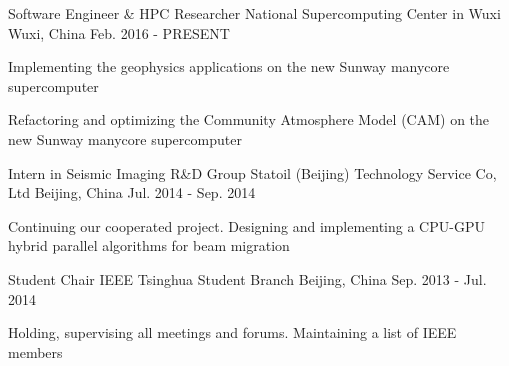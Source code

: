 

\begin{cventries}

  \cventry
    {Software Engineer \& HPC Researcher} %
    {National Supercomputing Center in Wuxi} %
    {Wuxi, China} %
    {Feb. 2016 - PRESENT} %
    {
      \begin{cvitems} %
        \item {Implementing the geophysics applications on the new Sunway manycore supercomputer}
        \item {Refactoring and optimizing the Community Atmosphere Model (CAM) on the new Sunway manycore supercomputer}
      \end{cvitems}
    }

  \cventry
    {Intern in Seismic Imaging R\&D Group} %
    {Statoil (Beijing) Technology Service Co, Ltd} %
    {Beijing, China} %
    {Jul. 2014 - Sep. 2014} %
    {
      \begin{cvitems} %
        \item {Continuing our cooperated project. Designing and implementing a CPU-GPU hybrid parallel algorithms for beam migration}
      \end{cvitems}
    }

  \cventry
    {Student Chair} %
    {IEEE Tsinghua Student Branch} %
    {Beijing, China} %
    {Sep. 2013 - Jul. 2014} %
    {
      \begin{cvitems} %
        \item {Holding, supervising all meetings and forums. Maintaining a list of IEEE members}
      \end{cvitems}
    }

\end{cventries}
